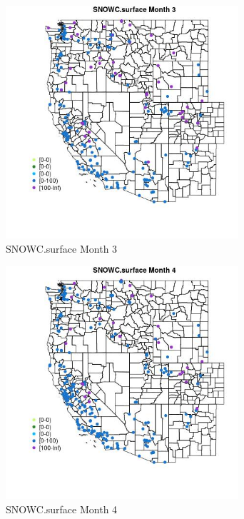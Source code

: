 \begin{figure} 
\centering  
\includegraphics[width=0.77\textwidth]{Code_Outputs/Report_ML_input_PM25_Step4_part_e_de_duplicated_aveswNAs_MapObsMo3SNOWCsurface.jpg} 
\caption{\label{fig:Report_ML_input_PM25_Step4_part_e_de_duplicated_aveswNAsMapObsMo3SNOWCsurface}SNOWC.surface Month 3} 
\end{figure} 
 

\begin{figure} 
\centering  
\includegraphics[width=0.77\textwidth]{Code_Outputs/Report_ML_input_PM25_Step4_part_e_de_duplicated_aveswNAs_MapObsMo4SNOWCsurface.jpg} 
\caption{\label{fig:Report_ML_input_PM25_Step4_part_e_de_duplicated_aveswNAsMapObsMo4SNOWCsurface}SNOWC.surface Month 4} 
\end{figure} 
 

